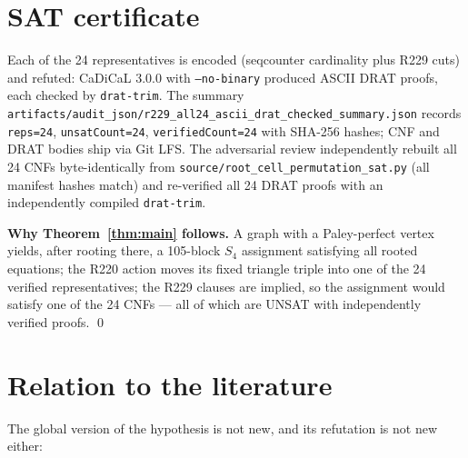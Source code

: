 \documentclass[11pt]{article}
\begin{document}
\section{SAT certificate}

Each of the 24 representatives is encoded (seqcounter cardinality plus R229
cuts) and refuted: CaDiCaL 3.0.0 with \texttt{--no-binary} produced ASCII DRAT
proofs, each checked by \texttt{drat-trim}.  The summary
\texttt{artifacts/audit\_json/r229\_all24\_ascii\_drat\_checked\_summary.json}
records \texttt{reps=24}, \texttt{unsatCount=24}, \texttt{verifiedCount=24}
with SHA-256 hashes; CNF and DRAT bodies ship via Git LFS.  The adversarial
review independently rebuilt all 24 CNFs byte-identically from
\texttt{source/root\_cell\_permutation\_sat.py} (all manifest hashes match)
and re-verified all 24 DRAT proofs with an independently compiled
\texttt{drat-trim}.

\medskip
\noindent\textbf{Why Theorem~\ref{thm:main} follows.}  A graph with a
Paley-perfect vertex yields, after rooting there, a 105-block \(S_4\)
assignment satisfying all rooted equations; the R220 action moves its fixed
triangle triple into one of the 24 verified representatives; the R229 clauses
are implied, so the assignment would satisfy one of the 24 CNFs --- all of
which are UNSAT with independently verified proofs. \qed

\section{Relation to the literature}

The global version of the hypothesis is not new, and its refutation is not
new either:
\end{document}

